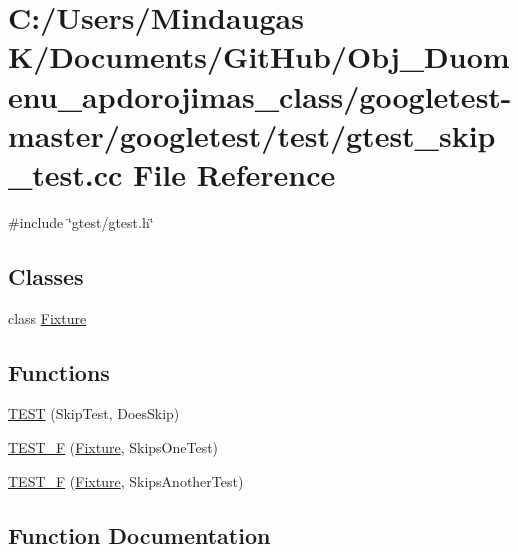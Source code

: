 \hypertarget{googletest-master_2googletest_2test_2gtest__skip__test_8cc}{}\section{C\+:/\+Users/\+Mindaugas K/\+Documents/\+Git\+Hub/\+Obj\+\_\+\+Duomenu\+\_\+apdorojimas\+\_\+class/googletest-\/master/googletest/test/gtest\+\_\+skip\+\_\+test.cc File Reference}
\label{googletest-master_2googletest_2test_2gtest__skip__test_8cc}
{\ttfamily \#include \char`\"{}gtest/gtest.\+h\char`\"{}}\newline
\subsection*{Classes}
\begin{DoxyCompactItemize}
\item 
class \mbox{\hyperlink{class_fixture}{Fixture}}
\end{DoxyCompactItemize}
\subsection*{Functions}
\begin{DoxyCompactItemize}
\item 
\mbox{\hyperlink{googletest-master_2googletest_2test_2gtest__skip__test_8cc_aa7f480df6c65426af4674b1cd81749b0}{T\+E\+ST}} (Skip\+Test, Does\+Skip)
\item 
\mbox{\hyperlink{googletest-master_2googletest_2test_2gtest__skip__test_8cc_a562ce30ed6cc2d7bd26442c8af3ef46a}{T\+E\+S\+T\+\_\+F}} (\mbox{\hyperlink{class_fixture}{Fixture}}, Skips\+One\+Test)
\item 
\mbox{\hyperlink{googletest-master_2googletest_2test_2gtest__skip__test_8cc_acc5e9e90a58e7d37f3b6d5560e9db993}{T\+E\+S\+T\+\_\+F}} (\mbox{\hyperlink{class_fixture}{Fixture}}, Skips\+Another\+Test)
\end{DoxyCompactItemize}


\subsection{Function Documentation}
\mbox{\label{googletest-master_2googletest_2test_2gtest__skip__test_8cc_aa7f480df6c65426af4674b1cd81749b0}} 
